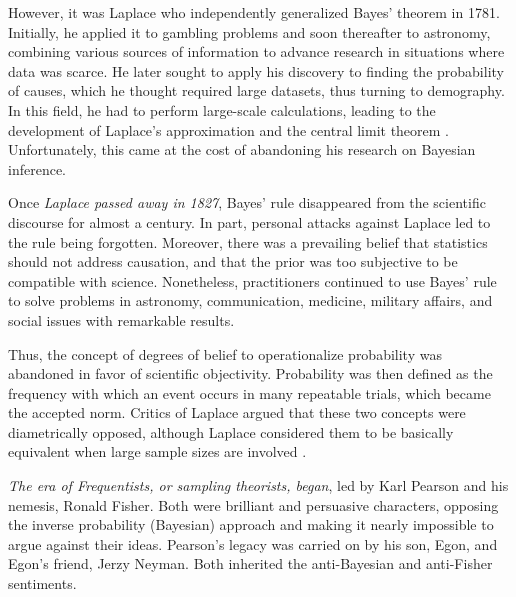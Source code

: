 However, it was Laplace who independently generalized Bayes' theorem in 1781. Initially, he applied it to gambling problems and soon thereafter to astronomy, combining various sources of information to advance research in situations where data was scarce. He later sought to apply his discovery to finding the probability of causes, which he thought required large datasets, thus turning to demography. In this field, he had to perform large-scale calculations, leading to the development of Laplace’s approximation and the central limit theorem \cite{Laplace1812}. Unfortunately, this came at the cost of abandoning his research on Bayesian inference.

Once \textit{Laplace passed away in 1827}, Bayes' rule disappeared from the scientific discourse for almost a century. In part, personal attacks against Laplace led to the rule being forgotten. Moreover, there was a prevailing belief that statistics should not address causation, and that the prior was too subjective to be compatible with science. Nonetheless, practitioners continued to use Bayes' rule to solve problems in astronomy, communication, medicine, military affairs, and social issues with remarkable results.

Thus, the concept of degrees of belief to operationalize probability was abandoned in favor of scientific objectivity. Probability was then defined as the frequency with which an event occurs in many repeatable trials, which became the accepted norm. Critics of Laplace argued that these two concepts were diametrically opposed, although Laplace considered them to be basically equivalent when large sample sizes are involved \cite{mcgrayne2011theory}.

\textit{The era of Frequentists, or sampling theorists, began}, led by Karl Pearson and his nemesis, Ronald Fisher. Both were brilliant and persuasive characters, opposing the inverse probability (Bayesian) approach and making it nearly impossible to argue against their ideas. Pearson's legacy was carried on by his son, Egon, and Egon’s friend, Jerzy Neyman. Both inherited the anti-Bayesian and anti-Fisher sentiments.

